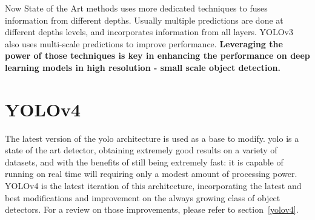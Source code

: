 Now State of the Art methods uses more dedicated techniques to fuses information from different depths. Usually multiple predictions are done at different depths levels, and incorporates information from all layers.  YOLOv3\cite{yolov3} also uses multi-scale predictions to improve performance. \textbf{Leveraging the power of those techniques is key in enhancing the performance on deep learning models in high resolution - small scale object detection.}

\section{YOLOv4}
The latest version of the \gls{yolo} architecture is used as a base to modify. \gls{yolo} is a state of the art detector, obtaining extremely good results on a variety of datasets, and with the benefits of still being extremely fast: it is capable of running on real time will requiring only a modest amount of processing power. YOLOv4 is the latest iteration of this architecture, incorporating the latest and best modifications and improvement on the always growing class of object detectors. For a review on those improvements, please refer to section~\ref{yolov4}. 

